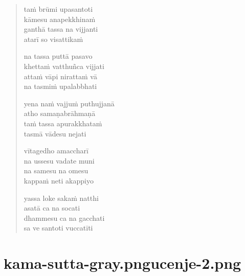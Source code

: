 \begin{verse}
taṁ brūmi upasantoti\\
kāmesu anapekkhinaṁ\\
ganthā tassa na vijjanti\\
atarī so visattikaṁ

na tassa puttā pasavo\\
khettaṁ vatthuñca vijjati\\
attaṁ vāpi nirattaṁ vā\\
na tasmiṁ upalabbhati

yena naṁ vajjuṁ puthujjanā\\
atho samaṇabrāhmaṇā\\
taṁ tassa apurakkhataṁ\\
tasmā vādesu nejati

vītagedho amaccharī\\
na ussesu vadate muni\\
na samesu na omesu\\
kappaṁ neti akappiyo

yassa loke sakaṁ natthi\\
asatā ca na socati\\
dhammesu ca na gacchati\\
sa ve santoti vuccatīti

\end{verse}


\chapter[Purābheda Sutta]{{kama-sutta-gray.png}{ucenje-2.png}}

